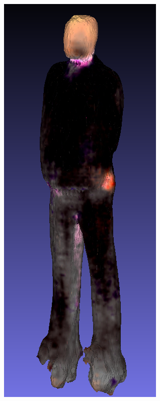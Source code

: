 \begin{figure}[ht]
    \centering
    \small
    \begin{subfigure}[b]{0.108\textwidth}
        \centering
        \includegraphics[width=\textwidth]{etc/bias/bias_rich_dreamfusion.png}

\end{subfigure}
\end{figure}
